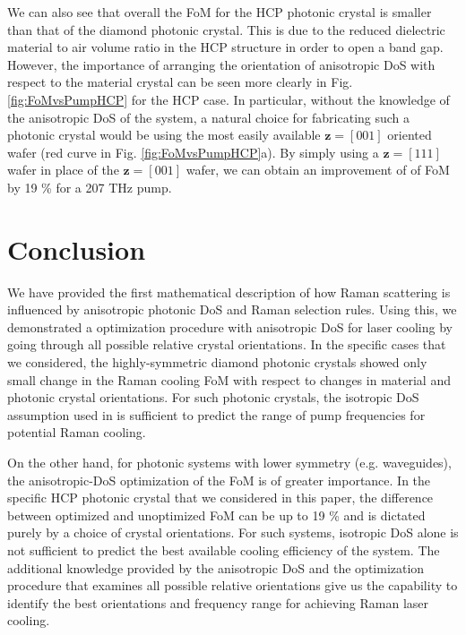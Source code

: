 \documentclass[%
 reprint,
superscriptaddress,
 amsmath,amssymb,
 aps,
pra,
]{revtex4-1}
\newcommand{\mb}[1]{\mathbf{#1}} %
\begin{document}
We can also see that overall the FoM for the HCP photonic crystal is smaller than that of the diamond photonic crystal. This is due to the reduced dielectric material to air volume ratio in the HCP structure in order to open a band gap. However, the importance of arranging the orientation of anisotropic DoS with respect to the material crystal can be seen more clearly in Fig. \ref{fig:FoMvsPumpHCP} for the HCP case. In particular, without the knowledge of the anisotropic DoS of the system, a natural choice for fabricating such a photonic crystal would be using the most easily available $\mb{z}=[001]$ oriented wafer (red curve in Fig. \ref{fig:FoMvsPumpHCP}a). By simply using a $\mb{z}=[111]$ wafer in place of the $\mb{z}=[001]$ wafer, we can obtain an improvement of of FoM by 19 \% for a 207 THz pump.








\section{Conclusion}
We have provided the first mathematical description of how Raman scattering is influenced by anisotropic photonic DoS and Raman selection rules. Using this, we demonstrated a optimization procedure with anisotropic DoS for laser cooling by going through all possible relative crystal orientations. In the specific cases that we considered, the highly-symmetric diamond photonic crystals showed only small change in the Raman cooling FoM with respect to changes in material and photonic crystal orientations. For such photonic crystals, the isotropic DoS assumption used in \cite{chen2015raman} is sufficient to predict the range of pump frequencies for potential Raman cooling.

On the other hand, for photonic systems with lower symmetry (e.g. waveguides), the anisotropic-DoS optimization of the FoM is of greater importance. In the specific HCP photonic crystal that we considered in this paper, the difference between optimized and unoptimized FoM can be up to 19 \% and is dictated purely by a choice of crystal orientations. For such systems, isotropic DoS alone is not sufficient to predict the best available cooling efficiency of the system. The additional knowledge provided by the anisotropic DoS and the optimization procedure that examines all possible relative orientations give us the capability to identify the best orientations and frequency range for achieving Raman laser cooling.
\end{document}
